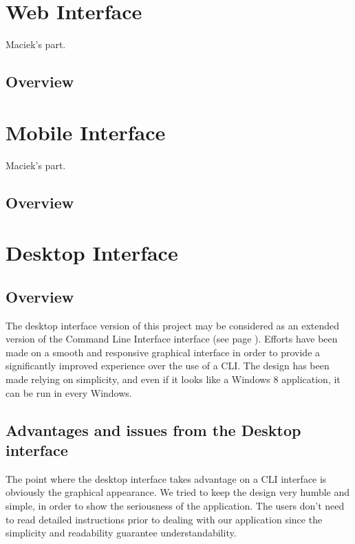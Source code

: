 \documentclass[a4paper,12pt, twocolumn]{article}
\begin{document}

\section*{Web Interface}
Maciek's part.

\subsection*{Overview}


\section*{Mobile Interface}
Maciek's part.

\subsection*{Overview}


\section*{Desktop Interface}



\subsection*{Overview}

The desktop interface version of this project may be considered as an extended version of the Command Line Interface interface (see page \pageref{cli}). Efforts have been made on a smooth and responsive graphical interface in order to provide a significantly improved experience over the use of a CLI. The design has been made relying on simplicity, and even if it looks like a Windows 8 application, it can be run in every Windows.

\subsection*{Advantages and issues from the Desktop interface}

The point where the desktop interface takes advantage on a CLI interface is obviously the graphical appearance. We tried to keep the design very humble and simple, in order to show the seriousness of the application. The users don't need to read detailed instructions prior to dealing with our application since the simplicity and readability guarantee understandability.
\end{document}
